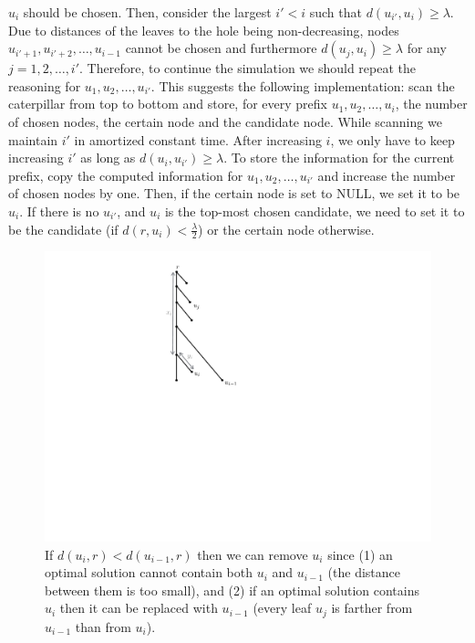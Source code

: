 \documentclass[11pt,a4paper]{article}
\newcounter{mycounter}
\newenvironment{noindlist}
 {\begin{list}{\arabic{mycounter}.~~}{\usecounter{mycounter} \labelsep=0em \labelwidth=0em \leftmargin=0em \itemindent=0em}}
 {\end{list}}
\theoremstyle{definition}
\theoremstyle{remark}
\begin{document}
\begin{noindlist}
$u_{i}$ should be chosen. Then, consider the largest $i'<i$ such that $d(u_{i'},u_{i})\geq \lambda$.
Due to distances of the leaves to the hole
being non-decreasing, nodes $u_{i'+1},u_{i'+2},\ldots,u_{i-1}$ cannot be chosen and furthermore $d(u_{j},u_{i})\geq \lambda$
for any $j=1,2,\ldots,i'$. Therefore, to continue the simulation we should repeat the reasoning for $u_{1},u_{2},\ldots,u_{i'}$.
This suggests the following implementation: scan the caterpillar from top to bottom and store, for every prefix $u_{1},u_{2},\ldots,u_{i}$,
the number of chosen nodes, the certain node and the candidate node. While scanning we maintain $i'$ in amortized constant time.
After increasing $i$, we only have to keep increasing $i'$ as long as $d(u_{i},u_{i'}) \ge \lambda$.
To store the information for the current prefix, copy the computed information for $u_{1},u_{2},\ldots,u_{i'}$
and increase the number of chosen nodes by one. Then, if the certain node is set to NULL, we set it to be $u_{i}$. If there is no $u_{i'}$, and $u_i$ is the top-most chosen candidate, we need to set it to be the candidate (if $d(r,u_i) < \frac{\lambda}{2}$) or the certain node otherwise.
\end{noindlist}

\begin{figure}[ht]
\begin{center}
\includegraphics[scale=0.45]{caterpillar}
\end{center}
\caption{If $d(u_i,r)<d(u_{i-1},r)$ then  we can remove $u_{i}$ since (1) an optimal solution cannot contain both $u_{i}$ and $u_{i-1}$ (the distance between them is too small), and (2) if an optimal solution contains $u_{i}$ then it can be replaced with $u_{i-1}$ (every leaf $u_j$ is farther from $u_{i-1}$ than from $u_i$). \label{fig:pruning}}
\end{figure}
\end{document}
